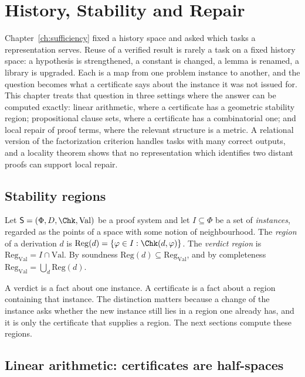 \chapter{History, Stability and Repair}
\label{ch:history-repair}

Chapter~\ref{ch:sufficiency} fixed a history space and asked which tasks a representation serves. Reuse of a verified result is rarely a task on a fixed history space: a hypothesis is strengthened, a constant is changed, a lemma is renamed, a library is upgraded. Each is a map from one problem instance to another, and the question becomes what a certificate says about the instance it was not issued for. This chapter treats that question in three settings where the answer can be computed exactly: linear arithmetic, where a certificate has a geometric stability region; propositional clause sets, where a certificate has a combinatorial one; and local repair of proof terms, where the relevant structure is a metric. A relational version of the factorization criterion handles tasks with many correct outputs, and a locality theorem shows that no representation which identifies two distant proofs can support local repair.

\section{Stability regions}

\begin{definition}
\label{def:region}
Let $\mathsf{S}=(\Phi,D,\Chk,\mathrm{Val})$ be a proof system and let $I\subseteq\Phi$ be a set of \emph{instances}, regarded as the points of a space with some notion of neighbourhood. The \emph{region} of a derivation $d$ is $\mathrm{Reg}(d)=\{\varphi\in I:\Chk(d,\varphi)\}$. The \emph{verdict region} is $\mathrm{Reg}_{\mathrm{Val}}=I\cap\mathrm{Val}$. By soundness $\mathrm{Reg}(d)\subseteq\mathrm{Reg}_{\mathrm{Val}}$, and by completeness $\mathrm{Reg}_{\mathrm{Val}}=\bigcup_d\mathrm{Reg}(d)$.
\end{definition}

A verdict is a fact about one instance. A certificate is a fact about a region containing that instance. The distinction matters because a change of the instance asks whether the new instance still lies in a region one already has, and it is only the certificate that supplies a region. The next sections compute these regions.

\section{Linear arithmetic: certificates are half-spaces}

